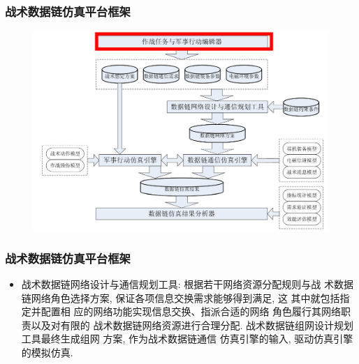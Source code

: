 \documentclass[10pt,mathserif]{beamer}%
\begin{document}
\begin{frame}[fragile]
	\frametitle{战术数据链仿真平台框架}
	\setlength{\parindent}{2em}
	\begin{spacing}{1.5}
		\begin{figure}[htb]
			\centering
			\includegraphics[width=1\linewidth]{./images/arch1.png}
		\end{figure}
	\end{spacing}
\end{frame}

\begin{frame}[fragile]
	\frametitle{战术数据链仿真平台框架}
	\begin{spacing}{1.5}
		\begin{itemize}
			\item 战术数据链网络设计与通信规划工具: 根据若干网络资源分配规则与战
				术数据链网络角色选择方案,  保证各项信息交换需求能够得到满足, 这
				其中就包括指定并配置相 应的网络功能实现信息交换、指派合适的网络
				角色履行其网络职责以及对有限的 战术数据链网络资源进行合理分配.
				战术数据链组网设计规划工具最终生成组网 方案, 作为战术数据链通信
				仿真引擎的输入, 驱动仿真引擎的模拟仿真. 
		\end{itemize}
	\end{spacing}
\end{frame}
\end{document}
